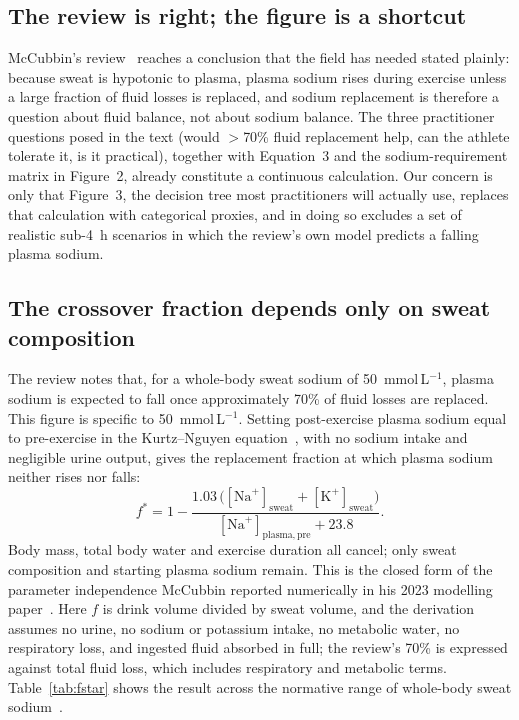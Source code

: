 \documentclass[11pt,a4paper]{article}
\newcommand{\Na}{[\mathrm{Na}^{+}]}
\newcommand{\K}{[\mathrm{K}^{+}]}
\newcommand{\mmolL}{mmol\,L$^{-1}$}
\newcommand{\fstar}{f^{*}}
\begin{document}
\subsection*{The review is right; the figure is a shortcut}

McCubbin's review~\cite{mccubbin2025} reaches a conclusion that the field has needed stated plainly: because sweat is hypotonic to plasma, plasma sodium rises during exercise unless a large fraction of fluid losses is replaced, and sodium replacement is therefore a question about fluid balance, not about sodium balance. The three practitioner questions posed in the text (would $>$70\% fluid replacement help, can the athlete tolerate it, is it practical), together with Equation~3 and the sodium-requirement matrix in Figure~2, already constitute a continuous calculation. Our concern is only that Figure~3, the decision tree most practitioners will actually use, replaces that calculation with categorical proxies, and in doing so excludes a set of realistic sub-4~h scenarios in which the review's own model predicts a falling plasma sodium.

\subsection*{The crossover fraction depends only on sweat composition}

The review notes that, for a whole-body sweat sodium of 50~\mmolL{}, plasma sodium is expected to fall once approximately 70\% of fluid losses are replaced. This figure is specific to 50~\mmolL{}. Setting post-exercise plasma sodium equal to pre-exercise in the Kurtz--Nguyen equation~\cite{kurtz2003}, with no sodium intake and negligible urine output, gives the replacement fraction at which plasma sodium neither rises nor falls:
\begin{equation}
\fstar = 1 - \frac{1.03\,\bigl(\Na_{\mathrm{sweat}} + \K_{\mathrm{sweat}}\bigr)}{\Na_{\mathrm{plasma,pre}} + 23.8}.
\label{eq:fstar}
\end{equation}
Body mass, total body water and exercise duration all cancel; only sweat composition and starting plasma sodium remain. This is the closed form of the parameter independence McCubbin reported numerically in his 2023 modelling paper~\cite{mccubbin2023}. Here $f$ is drink volume divided by sweat volume, and the derivation assumes no urine, no sodium or potassium intake, no metabolic water, no respiratory loss, and ingested fluid absorbed in full; the review's 70\% is expressed against total fluid loss, which includes respiratory and metabolic terms. Table~\ref{tab:fstar} shows the result across the normative range of whole-body sweat sodium~\cite{barnes2019}.
\end{document}
